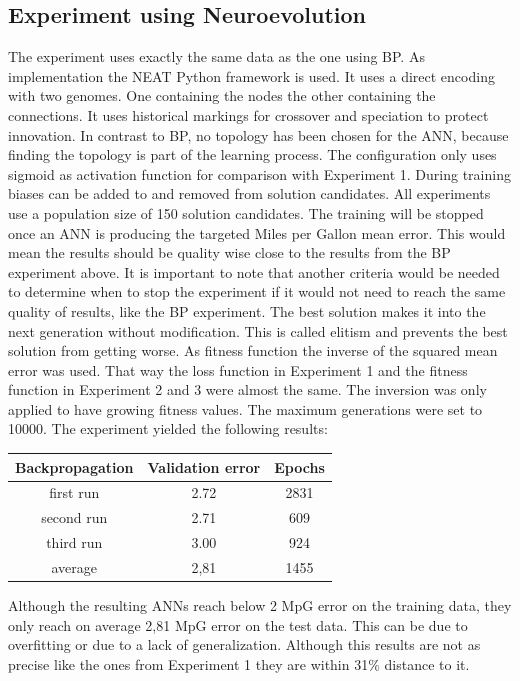 \documentclass{llncs}
\begin{document}
\subsection{Experiment using Neuroevolution}
%
The experiment uses exactly the same data as the one using BP. As implementation the NEAT Python framework \cite{AlanMcIntyreandMattKalladaandCesarG.MiguelandCarolinaFeherdaSilva.} is used. It uses a direct encoding with two genomes. One containing the nodes the other containing the connections. It uses historical markings for crossover and speciation to protect innovation. In contrast to BP, no topology has been chosen for the ANN, because finding the topology is part of the learning process. The configuration only uses sigmoid as activation function for comparison with Experiment 1. During training biases can be added to and removed from solution candidates.  All experiments use a population size of 150 solution candidates. The training will be stopped once an ANN is producing the targeted Miles per Gallon mean error. This would mean the results should be quality wise close to the results from the BP experiment above. It is important to note that another criteria would be needed to determine when to stop the experiment if it would not need to reach the same quality of results, like the BP experiment. The best solution makes it into the next generation without modification. This is called elitism and prevents the best solution from getting worse. As fitness function the inverse of the squared mean error was used. That way the loss function in Experiment 1 and the fitness function in Experiment 2 and 3 were almost the same. The inversion was only applied to have growing fitness values. The maximum generations were set to 10000. 
The experiment yielded the following results:
%
\begin{center}
	\begin{tabular}{ | c | c| c | } 
		\hline
		Backpropagation & Validation error & Epochs \\ 
		\hline
		first run & 2.72 & 2831 \\ 
		\hline
		second run & 2.71 & 609 \\ 
		\hline
		third run & 3.00 & 924 \\ 
		\hline
		average & 2,81 & 1455 \\ 
		\hline
	\end{tabular}
\end{center}
%
Although the resulting ANNs reach below 2 MpG error on the training data, they only reach on average 2,81 MpG error on the test data. This can be due to overfitting or due to a lack of generalization. Although this results are not as precise like the ones from Experiment 1 they are within 31\% distance to it. 
\end{document}
